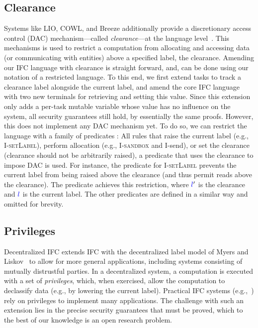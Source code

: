 \documentclass{llncs}
\begin{document}
\subsection{Clearance}
\label{sec:clearance}
Systems like LIO, COWL, and Breeze additionally provide a discretionary access
control (DAC) mechanism---called \emph{clearance}---at the language
level~\cite{Hritcu:2013:YIB:2497621.2498098, lio}.
This mechanisms is used to restrict a computation from allocating and
accessing data (or communicating with entities) above a specified
label, the clearance.
Amending our IFC language with clearance is straight forward,
and, can be done using our notation of a restricted language.
To this end, we first extend tasks to track a clearance label
alongside the current label, and amend the core IFC language with two
new terminals for retrieving and setting this value.
Since this extension only adds a per-task mutable variable whose value
has no influence on the system, all security guarantees still
hold, by essentially the same proofs.
However, this does not implement any DAC mechanism yet.
To do so, we can restrict the language with a family of predicates
:
All rules that
raise the current label (e.g., \textsc{I-setLabel}), perform
allocation (e.g., \textsc{I-sandbox} and \textsf{I-send}), or set the
clearance (clearance should not be arbitrarily raised), a predicate
that uses the clearance to impose DAC is used.
For instance, the predicate for \textsc{I-setLabel} prevents the
current label from being raised above the clearance (and thus permit
reads above the clearance).  The predicate  achieves this restriction, where \ensuremath{\ifc{l}'} is the
clearance and \ensuremath{\ifc{l}} is the current
label.
The other predicates are defined in a similar way and omitted for
brevity.


\subsection{Privileges}
Decentralized IFC extends IFC with the decentralized label model of
Myers and Liskov~\cite{myers:dlm} to allow for more general
applications, including systems consisting of mutually distrustful
parties.  In a decentralized system, a computation is executed with a
set of \emph{privileges}, which, when exercised, allow the computation
to declassify data (e.g., by lowering the current label).
Practical IFC systems
(e.g.,~\cite{Zeldovich:2006, lio,
  Hritcu:2013:YIB:2497621.2498098, myers:jif}) rely on privileges to
implement many applications.
The challenge with such an extension lies in the precise
security guarantees that must be proved, which to the best of our
knowledge is an open research problem.
\end{document}
